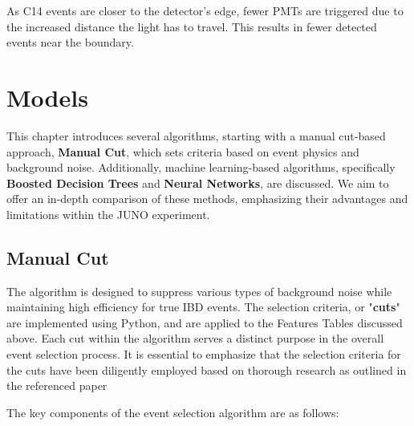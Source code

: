 As C14 events are closer to the detector's edge, fewer PMTs are triggered due to the increased distance the light has to travel. This results in fewer detected events near the boundary.

\section{Models}
This chapter introduces several algorithms, starting with a manual cut-based approach, \textbf{Manual Cut}, which sets criteria based on event physics and background noise. Additionally, machine learning-based algorithms, specifically \textbf{Boosted Decision Trees} and \textbf{Neural Networks}, are discussed. We aim to offer an in-depth comparison of these methods, emphasizing their advantages and limitations within the JUNO experiment.

\subsection{Manual Cut}
The algorithm is designed to suppress various types of background noise while maintaining high efficiency for true IBD events. The selection criteria, or "\textbf{cuts}" are implemented using Python, and are applied to the Features Tables discussed above. Each cut within the algorithm serves a distinct purpose in the overall event selection process. It is essential to emphasize that the selection criteria for the cuts have been diligently employed based on thorough research as outlined in the referenced paper %

The key components of the event selection algorithm are as follows:

